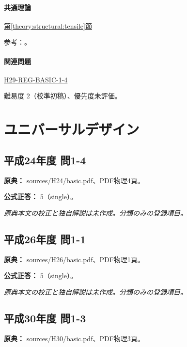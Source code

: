 \paragraph{共通理論} \hyperref[theory:structural:tensile]{第\ref*{theory:structural:tensile}節}

\par 参考：\cite{struct_mit_beam,struct_mit_buckling,struct_mlit_limit}。

\paragraph{関連問題} \hyperref[q:h29-reg-basic-1-4]{H29-REG-BASIC-1-4}

\par 難易度 2（校準初稿）、優先度未評価。

\section{ユニバーサルデザイン}

\subsection{平成24年度 問1-4}
\label{q:h24-reg-basic-1-4}

\noindent\textbf{原典：} sources/H24/basic.pdf、PDF物理4頁。

\textbf{公式正答：} 5（single）。

\par\textit{原典本文の校正と独自解説は未作成。分類のみの登録項目。}

\subsection{平成26年度 問1-1}
\label{q:h26-reg-basic-1-1}

\noindent\textbf{原典：} sources/H26/basic.pdf、PDF物理1頁。

\textbf{公式正答：} 5（single）。

\par\textit{原典本文の校正と独自解説は未作成。分類のみの登録項目。}

\subsection{平成30年度 問1-3}
\label{q:h30-reg-basic-1-3}

\noindent\textbf{原典：} sources/H30/basic.pdf、PDF物理3頁。

